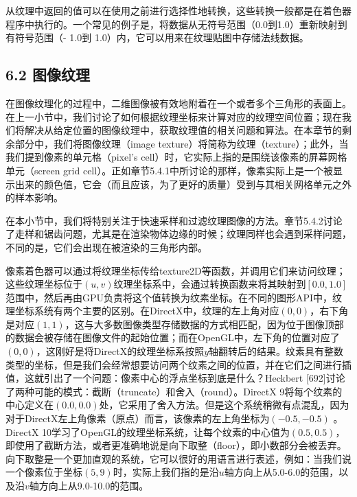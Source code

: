 \documentclass[
  paper=a4,
  ,captions=tableheading
]{scrartcl}
\begin{document}
从纹理中返回的值可以在使用之前进行选择性地转换，这些转换一般都是在着色器程序中执行的。一个常见的例子是，将数据从无符号范围（0.0到1.0）重新映射到有符号范围（-
1.0到 1.0）内，它可以用来在纹理贴图中存储法线数据。

\subsection{6.2 图像纹理}\label{ux56feux50cfux7eb9ux7406}

在图像纹理化的过程中，二维图像被有效地附着在一个或者多个三角形的表面上。在上一小节中，我们讨论了如何根据纹理坐标来计算对应的纹理空间位置；现在我们将解决从给定位置的图像纹理中，获取纹理值的相关问题和算法。在本章节的剩余部分中，我们将图像纹理（image
texture）将简称为纹理（texture）；此外，当我们提到像素的单元格（pixel's
cell）时，它实际上指的是围绕该像素的屏幕网格单元（screen grid
cell）。正如章节5.4.1中所讨论的那样，像素实际上是一个被显示出来的颜色值，它会（而且应该，为了更好的质量）受到与其相关网格单元之外的样本影响。

在本小节中，我们将特别关注于快速采样和过滤纹理图像的方法。章节5.4.2讨论了走样和锯齿问题，尤其是在渲染物体边缘的时候；纹理同样也会遇到采样问题，不同的是，它们会出现在被渲染的三角形内部。

像素着色器可以通过将纹理坐标传给texture2D等函数，并调用它们来访问纹理；这些纹理坐标位于\((u,v)\)纹理坐标系中，会通过转换函数来将其映射到\([0.0,1.0]\)范围中，然后再由GPU负责将这个值转换为纹素坐标。在不同的图形API中，纹理坐标系统有两个主要的区别。在DirectX中，纹理的左上角对应\((0,0)\)，右下角是对应\((1,1)\)，这与大多数图像类型存储数据的方式相匹配，因为位于图像顶部的数据会被存储在图像文件的起始位置；而在OpenGL中，左下角的位置对应了\((0,0)\)，这刚好是将DirectX的纹理坐标系按照\(y\)轴翻转后的结果。纹素具有整数类型的坐标，但是我们会经常想要访问两个纹素之间的位置，并在它们之间进行插值，这就引出了一个问题：像素中心的浮点坐标到底是什么？Heckbert
{[}692{]}讨论了两种可能的模式：截断（truncate）和舍入（round）。DirectX
9将每个纹素的中心定义在\((0.0,0.0)\)处，它采用了舍入方法。但是这个系统稍微有点混乱，因为对于DirectX左上角像素（原点）而言，该像素的左上角坐标为\((-0.5, -0.5)\)
。DirectX
10学习了OpenGL的纹理坐标系统，让每个纹素的中心值为\((0.5,0.5)\)，即使用了截断方法，或者更准确地说是向下取整（floor），即小数部分会被丢弃。向下取整是一个更加直观的系统，它可以很好的用语言进行表述，例如：当我们说一个像素位于坐标\((5,9)\)时，实际上我们指的是沿\(u\)轴方向上从5.0-6.0的范围，以及沿\(v\)轴方向上从9.0-10.0的范围。
\end{document}

